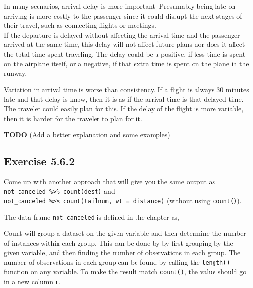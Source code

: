 \documentclass[]{book}
\newenvironment{Shaded}{\begin{snugshade}}{\end{snugshade}}
\newcommand{\KeywordTok}[1]{\textcolor[rgb]{0.13,0.29,0.53}{\textbf{#1}}}
\newcommand{\NormalTok}[1]{#1}
\newcommand{\OperatorTok}[1]{\textcolor[rgb]{0.81,0.36,0.00}{\textbf{#1}}}
\newcommand{\StringTok}[1]{\textcolor[rgb]{0.31,0.60,0.02}{#1}}
\theoremstyle{plain}
\theoremstyle{remark}
\begin{document}
In many scenarios, arrival delay is more important. Presumably being
late on arriving is more costly to the passenger since it could disrupt
the next stages of their travel, such as connecting flights or
meetings.\\
If the departure is delayed without affecting the arrival time and the
passenger arrived at the same time, this delay will not affect future
plans nor does it affect the total time spent traveling. The delay could
be a positive, if less time is spent on the airplane itself, or a
negative, if that extra time is spent on the plane in the runway.

Variation in arrival time is worse than consistency. If a flight is
always 30 minutes late and that delay is know, then it is as if the
arrival time is that delayed time. The traveler could easily plan for
this. If the delay of the flight is more variable, then it is harder for
the traveler to plan for it.

\textbf{TODO} (Add a better explanation and some examples)

\hypertarget{exercise-5.6.2}{%
\subsection*{\texorpdfstring{Exercise
{5.6.2}}{Exercise 5.6.2}}\label{exercise-5.6.2}}

Come up with another approach that will give you the same output as
\texttt{not\_canceled\ \%\textgreater{}\%\ count(dest)} and
\texttt{not\_canceled\ \%\textgreater{}\%\ count(tailnum,\ wt\ =\ distance)}
(without using \texttt{count()}).

The data frame \texttt{not\_canceled} is defined in the chapter as,

\begin{Shaded}
\end{Shaded}

Count will group a dataset on the given variable and then determine the
number of instances within each group. This can be done by by first
grouping by the given variable, and then finding the number of
observations in each group. The number of observations in each group can
be found by calling the \texttt{length()} function on any variable. To
make the result match \texttt{count()}, the value should go in a new
column \texttt{n}.
\end{document}
